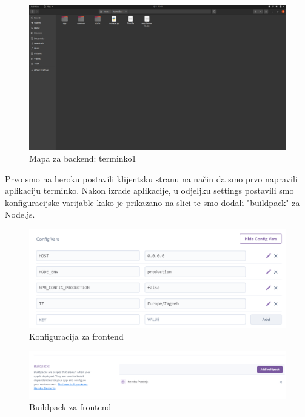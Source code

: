 			\begin{figure}[H]
				\centering
				\includegraphics[scale=0.25]{slike/BackendMapa.PNG}
				\caption{Mapa za backend: terminko1}
				\label{fig:promjene}
			\end{figure}
		
			Prvo smo na heroku postavili klijentsku stranu na način da smo prvo napravili aplikaciju terminko. Nakon izrade aplikacije, u odjeljku settings postavili smo konfiguracijske varijable kako je prikazano na slici te smo dodali "buildpack" za Node.js.
			
			\begin{figure}[H]
				\centering
				\includegraphics[scale=0.65]{slike/KonfiguracijaFrontend.PNG}
				\caption{Konfiguracija za frontend}
				\label{fig:promjene}
			\end{figure}
		
			\begin{figure}[H]
				\centering
				\includegraphics[scale=0.45]{slike/BuildpackFrontend.PNG}
				\caption{Buildpack za frontend}
				\label{fig:promjene}
			\end{figure}
		
